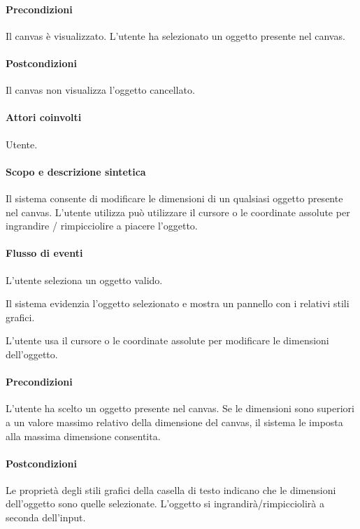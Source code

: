 \paragraph{Precondizioni} Il canvas \`e visualizzato. L'utente ha selezionato un oggetto presente nel canvas.
\paragraph{Postcondizioni} Il canvas non visualizza l'oggetto cancellato.

\paragraph{Attori coinvolti} Utente.
\paragraph{Scopo e descrizione sintetica}  Il sistema consente di modificare le dimensioni  di un qualsiasi oggetto presente nel canvas.  L'utente utilizza pu\`o utilizzare il cursore o le coordinate assolute per ingrandire / rimpicciolire a piacere l'oggetto.
\paragraph{Flusso di eventi}
\begin{elenconumerato}[\textbf{}]{\subsubsecindent}
\item  L'utente seleziona un oggetto valido.
\item  Il sistema evidenzia l'oggetto selezionato e mostra un pannello con i relativi stili grafici.
\item  L'utente usa il cursore o le coordinate assolute per modificare le dimensioni dell'oggetto.
\end{elenconumerato}
\paragraph{Precondizioni} L'utente ha scelto un oggetto presente nel canvas. Se le dimensioni sono superiori a un valore massimo relativo della dimensione del canvas, il sistema le imposta alla massima dimensione consentita.
\paragraph{Postcondizioni} Le propriet\`a  degli stili grafici della casella di testo indicano che le dimensioni dell'oggetto sono quelle selezionate. L'oggetto si ingrandir\` a/rimpicciolir\`a a seconda dell'input.

